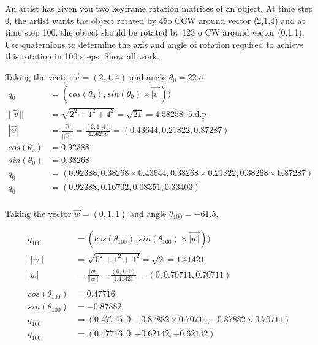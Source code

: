 \documentclass{report}
\begin{document}
An artist has given you two keyframe rotation matrices of an object.  At time step 0, the artist wants the object rotated by 45o CCW around vector (2,1,4) and at time step 100, the object should be rotated by 123 o CW around vector (0,1,1).
Use quaternions to determine the axis and angle of rotation required to achieve this rotation in 100 steps.  Show all work.



Taking the vector $\vec{v} = (2,1,4)$ and angle $\theta_0 = 22.5$.
\begin{align*}
q_0 &= (cos(\theta_0), sin(\theta_0) \times \vec{|v|}))\\[1em]
||\vec{v}|| &= \sqrt{2^2 + 1^ 2 + 4^2}
= \sqrt{21} 
= 4.58258 \; \; 5 \text{.d.p}\\[1em]
%
|\vec{v}| &= 
\frac{\vec{v}}{||\vec{v}||} = 
\frac{(2, 1, 4)}{4.58258 }
= (0.43644, 0.21822, 0.87287)\\[1em]
%
cos(\theta_0) &= 0.92388\\[1em]
sin(\theta_0) &= 0.38268\\[1em]
q_0 &= (0.92388,0.38268 \times 0.43644, 0.38268 \times 0.21822, 0.38268 \times 0.87287)\\[1em]
q_0 &= (0.92388, 0.16702, 0.08351, 0.33403)\\[1em]
\end{align*}

Taking the vector $\vec{w} = (0,1,1)$ and angle $\theta_{100} = -61.5$.

\begin{align*}
q_{100} &= (cos(\theta_{100}), sin(\theta_{100}) \times \vec{|w|}))\\[1em]
||w|| &= \sqrt{0^2 + 1^2 + 1^2} = \sqrt{2} = 1.41421\\[1em]
|w| &= \frac{|w|}{||w||} = \frac{(0,1,1)}{1.41421} = (0, 0.70711, 0.70711)\\[1em]
\\[1em]
cos(\theta_{100}) &= 0.47716\\[1em]
sin(\theta_{100}) &= -0.87882\\[1em]
q_{100} &= (0.47716, 0, -0.87882 \times 0.70711, -0.87882 \times 0.70711)\\[1em]
q_{100} &= (0.47716, 0, -0.62142, -0.62142)\\[1em]
\end{align*}
\end{document}

